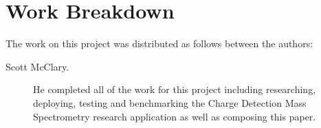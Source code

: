 \documentclass[9pt,twocolumn,twoside]{../../styles/osajnl}
\begin{document}
\section*{} %
\section*{Work Breakdown}
The work on this project was distributed as follows between the
authors:
\begin{description}
\item[Scott McClary.] He completed all of the work for this project
  including researching, deploying, testing and benchmarking the
  Charge Detection Mass Spectrometry research application as well as
  composing this paper.
\end{description}


\end{document}
